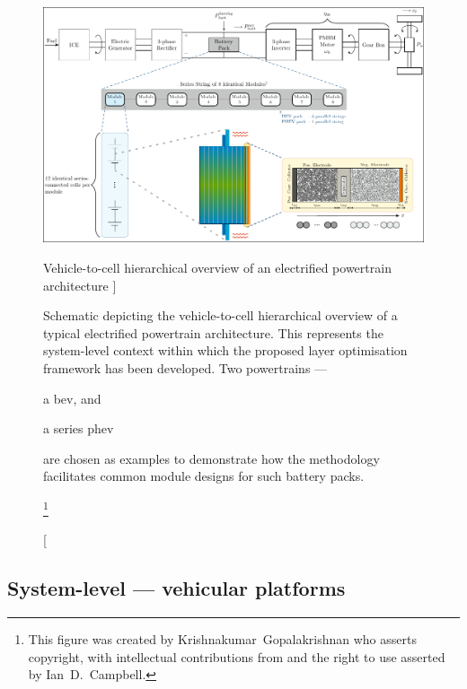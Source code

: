 \begin{figure}[!bp]
    \begin{minipage}[t]{\textwidth}
        \centering
        \includegraphics[width=\textwidth]{chapters/layer_opt/figures/hierarchical_powertrain_to_cell_layer.pdf}
        \captionsetup{labelsep=note}
        \caption
        [%
        Vehicle-to-cell hierarchical overview of an electrified powertrain architecture
        ]%
        {%
            Schematic depicting the vehicle-to-cell hierarchical overview of
            a typical electrified powertrain architecture. This represents the
            system-level context within which the proposed layer optimisation framework
            has been developed. Two  powertrains ---
            \begin{enumerate*}[label=\itshape\alph*\upshape)]
                \item a \gls{bev}, and
                \item a series \gls{phev}
            \end{enumerate*}
            are chosen as examples to demonstrate how the methodology facilitates
            common module designs for such battery packs.
        }%
        \label{fig:fig_PowertrainSchematic}
        \mpfootnotes[1]
        \footnote{This figure was created by \mbox{Krishnakumar Gopalakrishnan} who
            asserts copyright, with intellectual contributions from and the right to
        use asserted by \mbox{Ian D.\ Campbell}.}
    \end{minipage}
\end{figure}

\subsection{System-level --- vehicular platforms}

